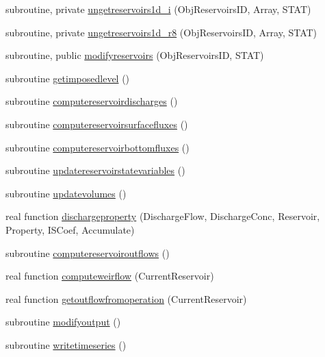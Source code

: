 \begin{DoxyCompactItemize}
subroutine, private \mbox{\hyperlink{namespacemodulereservoirs_aef049b96a145e57423b0b2da90a0a934}{ungetreservoirs1d\+\_\+i}} (Obj\+Reservoirs\+ID, Array, S\+T\+AT)
\item 
subroutine, private \mbox{\hyperlink{namespacemodulereservoirs_abf51c8915a730bb078066132f1085b94}{ungetreservoirs1d\+\_\+r8}} (Obj\+Reservoirs\+ID, Array, S\+T\+AT)
\item 
subroutine, public \mbox{\hyperlink{namespacemodulereservoirs_a65da9561acff8444f90db1ccde975201}{modifyreservoirs}} (Obj\+Reservoirs\+ID, S\+T\+AT)
\item 
subroutine \mbox{\hyperlink{namespacemodulereservoirs_a7e40106c12c54cc753164ac30f0fbf04}{getimposedlevel}} ()
\item 
subroutine \mbox{\hyperlink{namespacemodulereservoirs_a8a99c19b113e1731bd473173c164300a}{computereservoirdischarges}} ()
\item 
subroutine \mbox{\hyperlink{namespacemodulereservoirs_ae746634227400b0849469114a5dc5c3f}{computereservoirsurfacefluxes}} ()
\item 
subroutine \mbox{\hyperlink{namespacemodulereservoirs_af226bfc3156ffdd375d5b81401036b46}{computereservoirbottomfluxes}} ()
\item 
subroutine \mbox{\hyperlink{namespacemodulereservoirs_a2c3bef9b0aaebe8a9cfd93bc27290e82}{updatereservoirstatevariables}} ()
\item 
subroutine \mbox{\hyperlink{namespacemodulereservoirs_a2af994aa3f7d8318c768f2960bb34e06}{updatevolumes}} ()
\item 
real function \mbox{\hyperlink{namespacemodulereservoirs_ad77a25bc54ff54f0753ca4576febd9fb}{dischargeproperty}} (Discharge\+Flow, Discharge\+Conc, Reservoir, Property, I\+S\+Coef, Accumulate)
\item 
subroutine \mbox{\hyperlink{namespacemodulereservoirs_a20b9abb4646405dacdb0a0927de2ec9b}{computereservoiroutflows}} ()
\item 
real function \mbox{\hyperlink{namespacemodulereservoirs_afd25bc9bcd078252383e6f67ef148826}{computeweirflow}} (Current\+Reservoir)
\item 
real function \mbox{\hyperlink{namespacemodulereservoirs_ac1692cb00cb68968ee7099ff5bf14ed0}{getoutflowfromoperation}} (Current\+Reservoir)
\item 
subroutine \mbox{\hyperlink{namespacemodulereservoirs_a72a469df722e5436ce882168e7d1c0bb}{modifyoutput}} ()
\item 
subroutine \mbox{\hyperlink{namespacemodulereservoirs_a8f4552bc7aa4adbe0bb04d768353a7b4}{writetimeseries}} ()

\end{DoxyCompactItemize}
